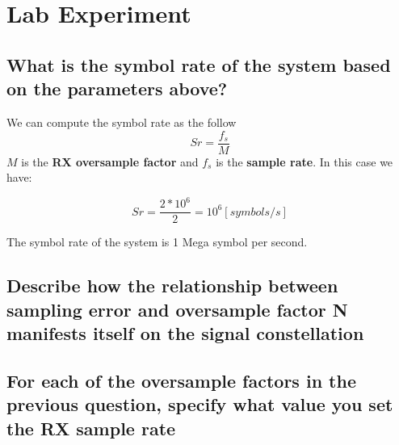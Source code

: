 \documentclass[frenchb, oneside, headings=normal]{scrartcl}
\begin{document}
\section{Lab Experiment}
\subsection{What is the symbol rate of the system based on the parameters above?}

We can compute the symbol rate as the follow
\begin{equation}
Sr =\frac{f_s}{M}
\end{equation}
$M$ is the \textbf{RX oversample factor} and $f_s$ is the \textbf{sample rate}. In this case we have:

$$Sr = \frac{2*10^{6}}{2} = 10^6[symbols/s]$$
       
The symbol rate of the system is 1 Mega symbol per second.

\subsection{Describe how the relationship between sampling error and oversample factor N manifests itself on the signal constellation}










\subsection{For each of the oversample factors in the previous question, specify what value you set the RX sample rate}
\end{document}
